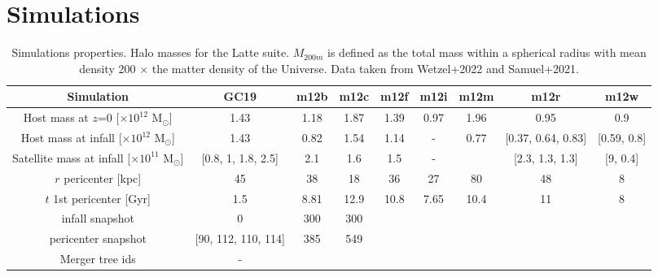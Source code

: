 \documentclass{aastex63}
\newcommand{\Msun}{M$_{\odot}$}
\begin{document}
\section{Simulations}\label{ref:sims}


\begin{table*}
    \centering
    \begin{tabular}{c c c c c c c c c}
    \hline
    Simulation & GC19 & m12b & m12c & m12f & m12i & m12m & m12r & m12w \\
    \hline
    \hline
    Host mass at $z$=0 [$\times 10^{12}$ \Msun] & 1.43 & 1.18 & 1.87 & 1.39 & 0.97 & 1.96 & 0.95 & 0.9 \\
    Host mass at infall [$\times 10^{12}$ \Msun] & 1.43 & 0.82 & 1.54 & 1.14 & - & 0.77& [0.37, 0.64, 0.83] &  [0.59, 0.8] \\

    Satellite mass at infall [$\times 10^{11}$ \Msun] & [0.8, 1, 1.8, 2.5] & 2.1 & 1.6 & 1.5 & - &  & [2.3, 1.3, 1.3] & [9, 0.4] \\ 
    $r$ pericenter [kpc] & 45 & 38 & 18 & 36 & 27 & 80 & 48 & 8 \\
    $t$ 1st pericenter [Gyr] & 1.5 & 8.81 & 12.9 & 10.8  & 7.65 & 10.4 & 11 & 8\\
    infall snapshot & 0 & 300 & 300 & & & & & \\
    pericenter snapshot & [90, 112, 110, 114] & 385 & 549 & & & & & \\
    Merger tree ids & - & & & & & & \\
    \hline 
    \end{tabular}
    \caption{Simulations properties. Halo masses for the Latte suite. $M_{200m}$ is defined as the total mass within a spherical radius with mean density 200 $\times$ the matter density of the Universe. Data taken from Wetzel+2022 and Samuel+2021. }
    \label{tab:fire_sats}
\end{table*}
\end{document}
